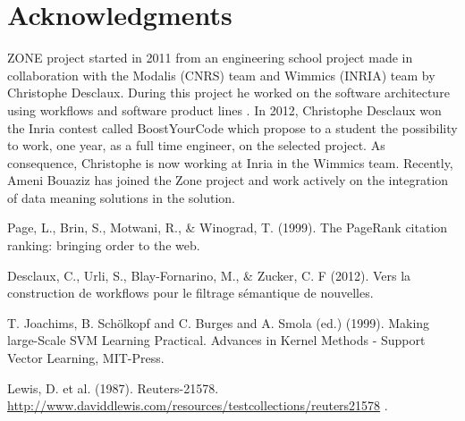 \documentclass{llncs}
\begin{document}
\section{Acknowledgments}
%
ZONE project started in 2011 from an engineering school project made in collaboration with the Modalis (CNRS) team and Wimmics (INRIA) team by Christophe Desclaux. During this project he worked on the software architecture using workflows and software product lines \cite{desclaux:urli}. In 2012, Christophe Desclaux won the Inria contest called BoostYourCode which propose to a student the possibility to work, one year, as a full time engineer, on the selected project. As consequence, Christophe is now working at Inria in the Wimmics team.  Recently, Ameni Bouaziz has joined the Zone project and work actively on the integration of data meaning solutions in the solution.
%
%
\begin{thebibliography}{5}
%
Page, L., Brin, S., Motwani, R., \& Winograd, T. (1999). The PageRank citation ranking: bringing order to the web.

Desclaux, C., Urli, S., Blay-Fornarino, M., \& Zucker, C. F (2012). Vers la construction de workflows pour le filtrage sémantique de nouvelles.

T. Joachims, B. Schölkopf and C. Burges and A. Smola (ed.) (1999). Making large-Scale SVM Learning Practical. Advances in Kernel Methods - Support Vector Learning, MIT-Press. 

Lewis, D. et al. (1987). Reuters-21578.
\url{http://www.daviddlewis.com/resources/testcollections/reuters21578}
.
\end{thebibliography}

\clearpage
\end{document}
